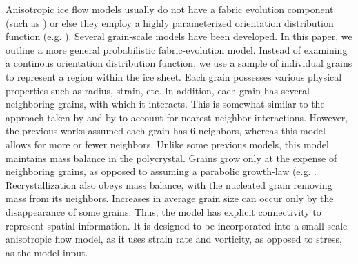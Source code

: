\documentclass[TC, hvmath, online]{copernicus}
\begin{document}
Anisotropic ice flow models usually do not have a fabric evolution component (such as \citet{pettit2007}) or else they employ a highly parameterized orientation distribution function (e.g. \citet{gillet2006}). Several grain-scale models have been developed. In this paper, we outline a more general probabilistic fabric-evolution model. Instead of examining a continous orientation distribution function, we use a sample of individual grains to represent a region within the ice sheet. Each grain possesses various physical properties such as radius, strain, etc. In addition, each grain has several neighboring grains, with which it interacts. This is somewhat similar to the approach taken by \citet{thorsteinsson2002nni} and by \citet{kennedy} to account for nearest neighbor interactions. However, the previous works assumed each grain has 6 neighbors, whereas this model allows for more or fewer neighbors. Unlike some previous models, this model maintains mass balance in the polycrystal. Grains grow only at the expense of neighboring grains, as opposed to assuming a parabolic growth-law (e.g. \citet{gow1969}. Recrystallization also obeys mass balance, with the nucleated grain removing mass from its neighbors. Increases in average grain size can occur only by the disappearance of some grains. Thus, the model has explicit connectivity to represent spatial information. It is designed to be incorporated into a small-scale anisotropic flow model, as it uses strain rate and vorticity, as opposed to stress, as the model input. 
\end{document}
